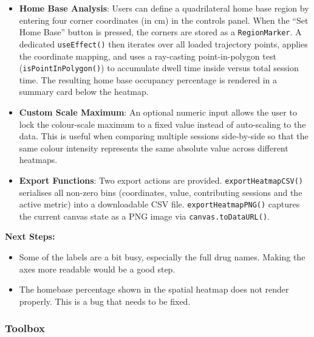 \documentclass{article}
\begin{document}
\begin{enumerate}
{\begin{itemize}
{      Grid lines and centimetre labels are overlaid, and any defined region markers (permanent arena objects in orange, home base in purple) are stroked as polygons on top of the heatmap.
      An \texttt{onMouseMove} handler on the canvas resolves the cursor position to a bin index and displays a floating tooltip with the bin's coordinates, aggregated value and contributing session IDs.}
      \item{\textbf{Home Base Analysis}: Users can define a quadrilateral home base region by entering four corner coordinates (in cm) in the controls panel. When the ``Set Home Base'' button is pressed,
      the corners are stored as a \texttt{RegionMarker}. A dedicated \texttt{useEffect()} then iterates over all loaded trajectory points, applies the coordinate mapping, and uses a ray-casting
      point-in-polygon test (\texttt{isPointInPolygon()}) to accumulate dwell time inside versus total session time. The resulting home base occupancy percentage is rendered in a summary card below the heatmap.}
      \item{\textbf{Custom Scale Maximum}: An optional numeric input allows the user to lock the colour-scale maximum to a fixed value instead of auto-scaling to the data.
      This is useful when comparing multiple sessions side-by-side so that the same colour intensity represents the same absolute value across different heatmaps.}
      \item{\textbf{Export Functions}: Two export actions are provided. \texttt{exportHeatmapCSV()} serialises all non-zero bins (coordinates, value, contributing sessions and the active metric) into a downloadable CSV file.
      \texttt{exportHeatmapPNG()} captures the current canvas state as a PNG image via \texttt{canvas.toDataURL()}.}
    \end{itemize}}

\end{enumerate}
\par{\textbf{Next Steps:}}
\begin{itemize}
  \item{Some of the labels are a bit busy, especially the full drug names. Making the axes more readable would be a good step.}
  \item{The homebase percentage shown in the spatial heatmap does not render properly. This is a bug that needs to be fixed.}
\end{itemize}
\subsubsection{Toolbox}
\end{document}
